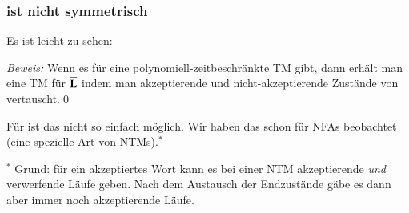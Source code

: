 \documentclass[aspectratio=1610,onlymath]{beamer}
\begin{document}
\begin{frame}\frametitle{ ist nicht symmetrisch}

Es ist leicht zu sehen:


\emph{Beweis:} Wenn es für  eine polynomiell-zeitbeschränkte TM 
gibt, dann erhält man eine TM für $\overline{\textbf{\textcolor{black}{L}}}$ indem man akzeptierende
und nicht-akzeptierende Zustände von  vertauscht.\qed
\medskip\pause

Für  ist das nicht so einfach möglich. Wir haben das schon für NFAs beobachtet (eine spezielle Art von NTMs).${}^*$



\medskip

{\tiny ${}^*$ Grund: für ein akzeptiertes Wort kann es bei einer NTM akzeptierende \emph{und} verwerfende Läufe geben. Nach dem Austausch der Endzustände gäbe es dann aber immer noch akzeptierende Läufe.\\
}

\end{frame}


\newcommand{\ppred}[1]{\color{myred}{\text{r}_{#1}}\color{text}{}}
\newcommand{\pgreen}[1]{\color{mygreen}{\text{g}_{#1}}\color{text}{}}
\newcommand{\pblue}[1]{\color{myblue}{\text{b}_{#1}}\color{text}{}}
\end{document}
